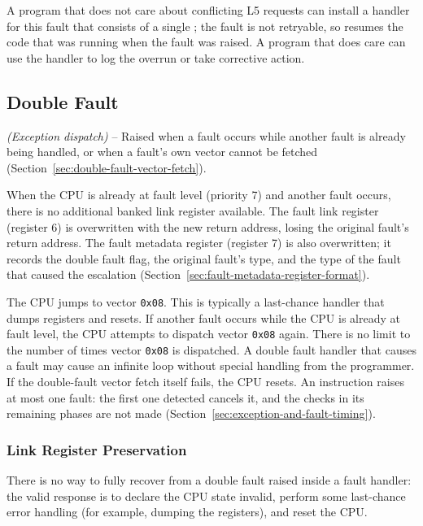 A program that does not care about conflicting L5 requests can install a handler for this fault that consists of a
single ; the fault is not retryable, so  resumes the code that was running when the fault
was raised. A program that does care can use the handler to log the overrun or take corrective action.

\subsection{Double Fault}
\label{sec:double-fault}

\textit{(Exception dispatch)} -- Raised when a fault occurs while another fault is
already being handled, or when a fault's own vector cannot be fetched (Section~\ref{sec:double-fault-vector-fetch}).

When the CPU is already at fault level (priority 7) and another fault occurs, there is no additional banked link
register available. The fault link register (register 6) is overwritten with the new return address, losing the
original fault's return address. The fault metadata register (register 7) is also overwritten; it records the double
fault flag, the original fault's type, and the type of the fault that caused the escalation
(Section~\ref{sec:fault-metadata-register-format}).

The CPU jumps to vector \texttt{0x08}. This is typically a last-chance handler that dumps registers and resets. If
another fault occurs while the CPU is already at fault level, the CPU attempts to dispatch vector \texttt{0x08} again.
There is no limit to the number of times vector \texttt{0x08} is dispatched. A double fault handler that causes a fault
may cause an infinite loop without special handling from the programmer. If the double-fault vector fetch itself fails,
the CPU resets. An instruction raises at most one fault: the first one detected cancels it, and the checks in its
remaining phases are not made (Section~\ref{sec:exception-and-fault-timing}).

\subsubsection{Link Register Preservation}

There is no way to fully recover from a double fault raised inside a fault handler: the valid response is to declare
the CPU state invalid, perform some last-chance error handling (for example, dumping the registers), and reset the CPU.

